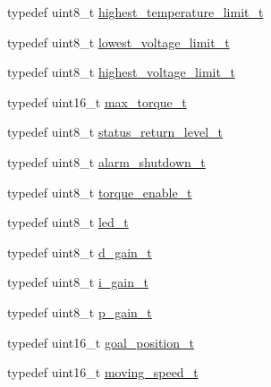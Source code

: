 \begin{DoxyCompactItemize}
\item 
typedef uint8\+\_\+t \hyperlink{structdynamixel_1_1servos_1_1_model_traits_3_01_xl320_01_4_1_1_c_t_a7dc8c5d096a90b9afc2000931d020af2}{highest\+\_\+temperature\+\_\+limit\+\_\+t}
\item 
typedef uint8\+\_\+t \hyperlink{structdynamixel_1_1servos_1_1_model_traits_3_01_xl320_01_4_1_1_c_t_a5dcff54fb03942d65c546117bf4e3050}{lowest\+\_\+voltage\+\_\+limit\+\_\+t}
\item 
typedef uint8\+\_\+t \hyperlink{structdynamixel_1_1servos_1_1_model_traits_3_01_xl320_01_4_1_1_c_t_ab7012a8706d9b353da37f4332a58aff5}{highest\+\_\+voltage\+\_\+limit\+\_\+t}
\item 
typedef uint16\+\_\+t \hyperlink{structdynamixel_1_1servos_1_1_model_traits_3_01_xl320_01_4_1_1_c_t_ab585a8275fa10ca3dd3e24491f90746f}{max\+\_\+torque\+\_\+t}
\item 
typedef uint8\+\_\+t \hyperlink{structdynamixel_1_1servos_1_1_model_traits_3_01_xl320_01_4_1_1_c_t_a8e8ea090a164c6277ea540bfc78717ec}{status\+\_\+return\+\_\+level\+\_\+t}
\item 
typedef uint8\+\_\+t \hyperlink{structdynamixel_1_1servos_1_1_model_traits_3_01_xl320_01_4_1_1_c_t_a500af3f1d165e75fe1b231f7a20e344e}{alarm\+\_\+shutdown\+\_\+t}
\item 
typedef uint8\+\_\+t \hyperlink{structdynamixel_1_1servos_1_1_model_traits_3_01_xl320_01_4_1_1_c_t_a0ca77b888fb8184c4467459ba36ba780}{torque\+\_\+enable\+\_\+t}
\item 
typedef uint8\+\_\+t \hyperlink{structdynamixel_1_1servos_1_1_model_traits_3_01_xl320_01_4_1_1_c_t_a962aedbfb2105b679409b51e8ca68edc}{led\+\_\+t}
\item 
typedef uint8\+\_\+t \hyperlink{structdynamixel_1_1servos_1_1_model_traits_3_01_xl320_01_4_1_1_c_t_a6faeb66c29d811feb3d6fed6d9fded77}{d\+\_\+gain\+\_\+t}
\item 
typedef uint8\+\_\+t \hyperlink{structdynamixel_1_1servos_1_1_model_traits_3_01_xl320_01_4_1_1_c_t_a0a72d5de0c32d648e07bca597dce6592}{i\+\_\+gain\+\_\+t}
\item 
typedef uint8\+\_\+t \hyperlink{structdynamixel_1_1servos_1_1_model_traits_3_01_xl320_01_4_1_1_c_t_aaed4aede15223f5e20b44a6511e83a37}{p\+\_\+gain\+\_\+t}
\item 
typedef uint16\+\_\+t \hyperlink{structdynamixel_1_1servos_1_1_model_traits_3_01_xl320_01_4_1_1_c_t_a51708d773547d52c0509c1fbe5c51f74}{goal\+\_\+position\+\_\+t}
\item 
typedef uint16\+\_\+t \hyperlink{structdynamixel_1_1servos_1_1_model_traits_3_01_xl320_01_4_1_1_c_t_adb924a8f7e3ce26ce5e406e30020582a}{moving\+\_\+speed\+\_\+t}

\end{DoxyCompactItemize}
